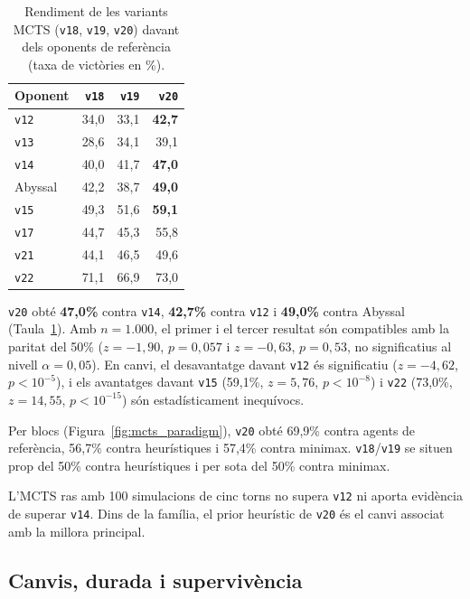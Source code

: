 \begin{table}[htbp]
\centering
\small
\caption{Rendiment de les variants MCTS (\texttt{v18}, \texttt{v19}, \texttt{v20}) davant dels oponents de referència (taxa de victòries en \%).}
\label{tab:mcts_comparators}
\begin{tabular}{lrrr}
\toprule
Oponent & \texttt{v18} & \texttt{v19} & \texttt{v20} \\
\midrule
\texttt{v12} & 34,0 & 33,1 & \textbf{42,7} \\
\texttt{v13} & 28,6 & 34,1 & 39,1 \\
\texttt{v14} & 40,0 & 41,7 & \textbf{47,0} \\
Abyssal & 42,2 & 38,7 & \textbf{49,0} \\
\texttt{v15} & 49,3 & 51,6 & \textbf{59,1} \\
\texttt{v17} & 44,7 & 45,3 & 55,8 \\
\texttt{v21} & 44,1 & 46,5 & 49,6 \\
\texttt{v22} & 71,1 & 66,9 & 73,0 \\
\bottomrule
\end{tabular}
\end{table}

\texttt{v20} obté \textbf{47,0\%} contra \texttt{v14}, \textbf{42,7\%} contra \texttt{v12} i \textbf{49,0\%} contra Abyssal (Taula~\ref{tab:mcts_comparators}). Amb $n=1.000$, el primer i el tercer resultat són compatibles amb la paritat del 50\% ($z = -1{,}90$, $p = 0{,}057$ i $z = -0{,}63$, $p = 0{,}53$, no significatius al nivell $\alpha=0{,}05$). En canvi, el desavantatge davant \texttt{v12} és significatiu ($z = -4{,}62$, $p < 10^{-5}$), i els avantatges davant \texttt{v15} (59,1\%, $z = 5{,}76$, $p < 10^{-8}$) i \texttt{v22} (73,0\%, $z = 14{,}55$, $p < 10^{-15}$) són estadísticament inequívocs.

Per blocs (Figura~\ref{fig:mcts_paradigm}), \texttt{v20} obté 69,9\% contra agents de referència, 56,7\% contra heurístiques i 57,4\% contra minimax. \texttt{v18}/\texttt{v19} se situen prop del 50\% contra heurístiques i per sota del 50\% contra minimax.

L'MCTS ras amb 100 simulacions de cinc torns no supera \texttt{v12} ni aporta evidència de superar \texttt{v14}. Dins de la família, el prior heurístic de \texttt{v20} és el canvi associat amb la millora principal.

\subsection{Canvis, durada i supervivència}

